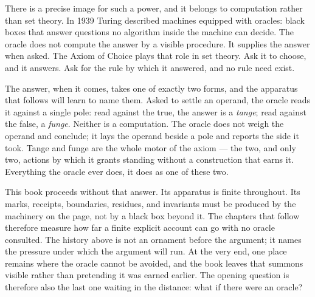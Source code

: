 There is a precise image for such a power, and it belongs to computation rather
than set theory. In 1939 Turing described machines equipped with oracles:
black boxes that answer questions no algorithm inside the machine can decide.
The oracle does not compute the answer by a visible procedure. It supplies the
answer when asked. The Axiom of Choice plays that role in set theory. Ask it
to choose, and it answers. Ask for the rule by which it answered, and no rule
need exist.

The answer, when it comes, takes one of exactly two forms, and the
apparatus that follows will learn to name them. Asked to settle an
operand, the oracle reads it against a single pole: read against the
true, the answer is a \emph{tange}; read against the false, a
\emph{funge}. Neither is a computation. The oracle does not weigh the
operand and conclude; it lays the operand beside a pole and reports the
side it took. Tange and funge are the whole motor of the axiom --- the
two, and only two, actions by which it grants standing without a
construction that earns it. Everything the oracle ever does, it does as
one of these two.

This book proceeds without that answer. Its apparatus is finite throughout.
Its marks, receipts, boundaries, residues, and invariants must be produced by
the machinery on the page, not by a black box beyond it. The chapters that
follow therefore measure how far a finite explicit account can go with no
oracle consulted. The history above is not an ornament before the argument; it
names the pressure under which the argument will run. At the very end, one
place remains where the oracle cannot be avoided, and the book leaves that
summons visible rather than pretending it was earned earlier. The opening
question is therefore also the last one waiting in the distance: what if there
were an oracle?
